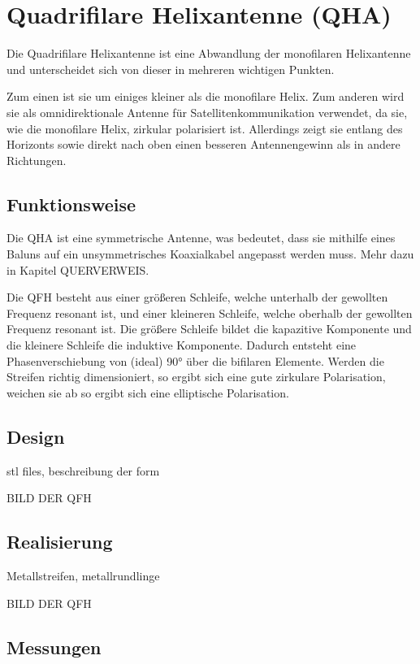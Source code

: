 \chapter{Quadrifilare Helixantenne (QHA)}
Die Quadrifilare Helixantenne ist eine Abwandlung der monofilaren Helixantenne und unterscheidet sich von dieser in mehreren wichtigen Punkten.

Zum einen ist sie um einiges kleiner als die monofilare Helix. Zum anderen wird sie als omnidirektionale Antenne für Satellitenkommunikation verwendet, da sie, wie die monofilare Helix, zirkular polarisiert ist. Allerdings zeigt sie entlang des Horizonts sowie direkt nach oben einen besseren Antennengewinn als in andere Richtungen.

\section{Funktionsweise}
Die QHA ist eine symmetrische Antenne, was bedeutet, dass sie mithilfe eines Baluns auf ein unsymmetrisches Koaxialkabel angepasst werden muss. Mehr dazu in Kapitel QUERVERWEIS.

Die QFH besteht aus einer größeren Schleife, welche unterhalb der gewollten Frequenz resonant ist, und einer kleineren Schleife, welche oberhalb der gewollten Frequenz resonant ist. Die größere Schleife bildet die kapazitive Komponente und die kleinere Schleife die induktive Komponente. Dadurch entsteht eine Phasenverschiebung von (ideal) 90° über die bifilaren Elemente. Werden die Streifen richtig dimensioniert, so ergibt sich eine gute zirkulare Polarisation, weichen sie ab so ergibt sich eine elliptische Polarisation.

\section{Design}
stl files, beschreibung der form

BILD DER QFH

\section{Realisierung}
Metallstreifen, metallrundlinge

BILD DER QFH

\section{Messungen}